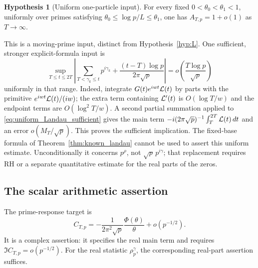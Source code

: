 \documentclass[11pt,reqno]{amsart}
\theoremstyle{plain}\newtheorem{theorem}{Theorem}[section]\newtheorem{proposition}[theorem]{Proposition}\newtheorem{lemma}[theorem]{Lemma}\newtheorem{corollary}[theorem]{Corollary}
\theoremstyle{definition}\newtheorem{hypothesis}[theorem]{Hypothesis}\newtheorem{definition}[theorem]{Definition}
\theoremstyle{remark}\newtheorem{remark}[theorem]{Remark}\newtheorem{experiment}[theorem]{Experiment}\newtheorem{question}[theorem]{Question}\newtheorem{heuristic}[theorem]{Heuristic}\newtheorem{conjecture}[theorem]{Conjecture}
\begin{document}
\begin{hypothesis}[Uniform one-particle input]\label{hyp:uniform_prime}
For every fixed $0<\theta_0<\theta_1<1$, uniformly over primes satisfying $\theta_0\le\log p/L\le\theta_1$, one has $A_{T,p}=1+o(1)$ as $T\to\infty$.
\end{hypothesis}
This is a moving-prime input, distinct from Hypothesis~\ref{hyp:L}. One sufficient, stronger explicit-formula input is
\begin{equation}
 \sup_{T\le t\le2T}
 \left|\sum_{T<\gamma_k\le t}p^{i\gamma_k}
       +\frac{(t-T)\log p}{2\pi\sqrt p}\right|
   =o\left(\frac{T\log p}{\sqrt p}\right)
 \label{eq:uniform_Landau_sufficient}
\end{equation}
uniformly in that range. Indeed, integrate $G(t)e^{iwt}\mathcal L(t)$ by parts with the primitive $e^{iwt}\mathcal L(t)/(iw)$; the extra term containing $\mathcal L'(t)$ is $O(\log T/w)$ and the endpoint terms are $O(\log^2T/w)$. A second partial summation applied to \eqref{eq:uniform_Landau_sufficient} gives the main term $-i(2\pi\sqrt p)^{-1}\int_T^{2T}\mathcal L(t)\,dt$ and an error $o(M_T/\sqrt p)$. This proves the sufficient implication. The fixed-base formula of Theorem~\ref{thm:known_landau} cannot be used to assert this uniform estimate. Unconditionally it concerns $p^\rho$, not $\sqrt p\,p^{i\gamma}$; that replacement requires RH or a separate quantitative estimate for the real parts of the zeros.

\subsection{The scalar arithmetic assertion}
\label{subsec:scalar_response_target}
The prime-response target is
\begin{equation}
 C_{T,p}=-\frac{1}{2\pi^2\sqrt p}\frac{\Phi(\theta)}{\theta}
                    +o(p^{-1/2}).
 \label{eq:CTp_target}
\end{equation}
It is a complex assertion: it specifies the real main term and requires $\Im C_{T,p}=o(p^{-1/2})$. For the real statistic $\rho_p^\gamma$, the corresponding real-part assertion suffices.
\end{document}
